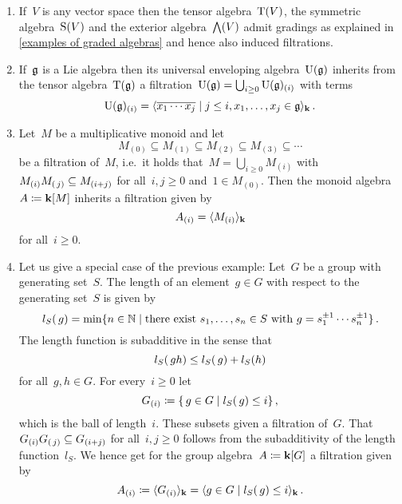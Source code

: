 \begin{examples}
  \leavevmode
  \begin{enumerate}
    \item
      If~$V$ is any vector space then the tensor algebra~$\operatorname{T}(V)$, the symmetric algebra~$\operatorname{S}(V)$ and the exterior algebra~$\bigwedge(V)$ admit gradings as explained in \cref{examples of graded algebras} and hence also induced filtrations.
    \item
      If~$\mathfrak{g}$ is a Lie algebra then its universal enveloping algebra~$\operatorname{U}(\mathfrak{g})$ inherits from the tensor algebra~$\operatorname{T}(\mathfrak{g})$ a filtration~$\operatorname{U}(\mathfrak{g}) = \bigcup_{i \geq 0} \operatorname{U}(\mathfrak{g})_{(i)}$ with terms
      \[
        \Univ(\glie)_{(i)}
        =
        \gen{
          \class{x_1 \dotsm x_j}
        \suchthat
          j \leq i,
          x_1, \dotsc, x_j \in \glie
        }_{\kf} \,.
      \]
    \item
      Let~$M$ be a multiplicative monoid and let
      \[
        M_{(0)}
        \subseteq
        M_{(1)}
        \subseteq
        M_{(2)}
        \subseteq
        M_{(3)}
        \subseteq
        \dotsb
      \]
      be a filtration of~$M$, i.e.\ it holds that~$M = \bigcup_{i \geq 0} M_{(i)}$ with~$M_{(i)} M_{(\, j)} \subseteq M_{(i+j)}$ for all~$i, j \geq 0$ and~$1 \in M_{(0)}$.
      Then the monoid algebra~$A \coloneqq \mathbf{k}[M]$ inherits a filtration given by
      \[
        A_{(i)}
        =
        \langle M_{(i)} \rangle_{\mathbf{k}}
      \]
      for all~$i \geq 0$.
    \item
      Let us give a special case of the previous example:
      Let~$G$ be a group with generating set~$S$.
      The length of an element~$g \in G$ with respect to the generating set~$S$ is given by
      \[
        l_S(\spacing g)
        =
        \min
        \{
          n \in \Natural
        \suchthat
          \text{there exist~$s_1, \dotsc, s_n \in S$ with~$g = s_1^{\pm 1} \dotsm s_n^{\pm 1}$}
        \}  \,.
      \]
      The length function is subadditive in the sense that
      \[
        l_S(\, gh)
        \leq
        l_S(\, g) + l_S(h)
      \]
      for all~$g, h \in G$.
      For every~$i \geq 0$ let
      \[
        G_{(i)}
        \defined
        \{
          \spacing g \in G
        \suchthat
          l_S(\spacing g) \leq i
        \}  \,,
      \]
      which is the ball of length~$i$.
      These subsets given a filtration of~$G$.
      That~$G_{(i)} G_{(\, j)} \subseteq G_{(i+j)}$ for all~$i, j \geq 0$ follows from the subadditivity of the length function~$l_S$.
      We hence get for the group algebra~$A \coloneqq \mathbf{k}[G]$ a filtration given by
      \[
        A_{(i)}
        \defined
        \gen{ G_{(i)} }_{\kf}
        =
        \gen{
          g \in G
        \suchthat
          l_S(\spacing g) \leq i
        }_{\kf} \,.
      \]
  \end{enumerate}
\end{examples}


